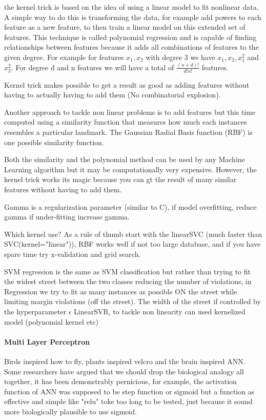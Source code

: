 \documentclass[9pt,twocolumn,twoside]{pnas-new}
\begin{document}
the kernel trick is based on the idea of using a linear model to fit nonlinear data. A simple way to do this is transforming the data, for example add powers to each feature as a new feature, to then train a linear model on this extended set of features. This technique is called polynomial regression and is capable of finding relationships between features because it adds all combinations of features to the given degree. For example for features $x_1, x_2$ with degree 3 we have $x_1,x_2, x_1^{2}$ and $x_{2}^2$. For degree d and n features we will have a total of $\frac{(n+d)!}{d!n!}$ features. 

Kernel trick makes possible to get a result as good as adding features without having to actually having to add them (No combinatorial explosion).

Another approach to tackle non linear problems is to add features but this time computed using a similarity function that measures how much each instances resembles a particular landmark. The Gaussian Radial Basis function (RBF) is one possible similarity function.

Both the similarity and the polynomial method can be used by any Machine Learning algorithm but it may be computationally very expensive. However, the kernel trick works its magic because you can gt the result of many similar features without having to add them.

Gamma is a regularization parameter (similar to C), if model overfitting, reduce gamma if under-fitting increase gamma.

Which kernel use? As a rule of thumb start with the linearSVC (much faster than SVC(kernel="linear")), RBF works well if not too large database, and if you have spare time try x-validation and grid search.

SVM regression is the same as SVM classification but rather than trying to fit the widest street between the two classes reducing the number of violations, in Regression we try to fit as many instances as possible ON the street while limiting margin violations (off the street). The width of the street if controlled by the hyperparameter $\epsilon$ 
LinearSVR, to tackle non linearity can used kernelized model (polynomial kernel etc)


\paragraph*{Multi Layer Perceptron}
Birds inspired how to fly, plants inspired velcro and the brain inspired ANN.
Some researchers have argued that we should drop the biological analogy all together, it has been demonstrably pernicious, for example, the activation function of ANN was supposed to be step function or sigmoid but a function as effective and simple like "relu" toke too long to be tested, just because it sound more biologically plausible to use sigmoid. %
\end{document}
